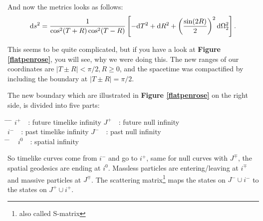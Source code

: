 	And now the metrics looks as follows:
		\begin{equation} \label{TRmetric}
			\mathrm{d} s^2=
			\frac{1}{\cos^2(T+R)\cos^2(T-R)}
			\left[- \mathrm{d} T^2+ \mathrm{d} R^2+\left(\frac{\sin(2R)}{2}\right)^2 \mathrm{d} \Omega^2_2 \right].
		\end{equation}	
					
	This seems to be quite complicated, but if you have a look at \textbf{Figure \ref{flatpenrose}}, you will see, why we were doing this. The new ranges of our coordinates are $|T \pm R|< \pi/2, R\geq0$, and the spacetime was compactified by including the boundary at $|T \pm R| = \pi/2$. 
	
	The new boundary which are illustrated in \textbf{Figure \ref{flatpenrose}} on the right side, is divided into five parts:	
		\begin{tabbing}
			\hspace{0.1\linewidth} \= \hspace{0.4\linewidth} \= \hspace{0.1\linewidth} \= \hfill \kill
			$i^+$~~: \> future timelike infinity \> $J^+$~~: \> future null infinity \\
			$i^-$~~: \> past timelike infinity \> $J^-$~~: \> past null infinity\\
			\hspace{0.35\linewidth} \= \hspace{0.1\linewidth} \= \hfill \kill	
			~ \> $i^0$~~: \> spatial infinity 
		\end{tabbing}
	So timelike curves come from $i^-$ and go to $i^+$, same for null curves with $J^\mp$, the spatial geodesics are ending at $i^0$. Massless particles are entering/leaving at $i^\mp$ and massive particles at $J^\mp$. The scattering matrix\footnote{also called S-matrix} maps the states on $J^- \cup i^-$ to the states on $J^+ \cup i^+$.	
	
